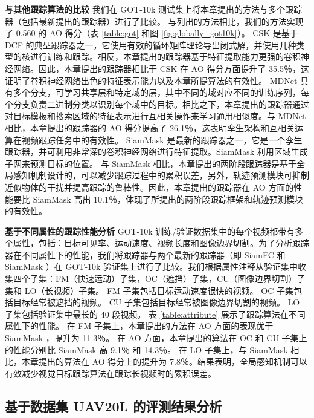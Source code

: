 \textbf{与其他跟踪算法的比较}
我们在 GOT-10k 测试集上将本章提出的方法与多个跟踪器（包括最新提出的跟踪器）进行了比较。
与列出的方法相比，我们的方法实现了 0.560 的 AO 得分（表 \ref{table:got} 和图 \ref{fig:globally_got10k}）。
CSK \cite{Henriques2012ExploitingTC} 是基于 DCF 的典型跟踪器之一，它使用有效的循环矩阵理论导出闭式解，并使用几种类型的核进行训练和跟踪。相反，本章提出的跟踪器基于特征提取能力更强的卷积神经网络。因此，本章提出的跟踪器相比于 CSK 在 AO 得分方面提升了 35.5％，这证明了卷积神经网络出色的特征表示能力以及本章所提算法的有效性。
MDNet \cite{MDNet} 具有多个分支，可学习共享层和特定域的层，其中不同的域对应不同的训练序列，每个分支负责二进制分类以识别每个域中的目标。相比之下，本章提出的跟踪器通过对目标模板和搜索区域的特征表示进行互相关操作来学习通用相似度。与 MDNet 相比，本章提出的跟踪器的 AO 得分提高了 26.1％，这表明孪生架构和互相关运算在视频跟踪任务中的有效性。
SiamMask \cite{Wang2018SiamMask} 是最新的跟踪器之一，它是一个孪生跟踪器，并可利用非常深的卷积神经网络进行特征提取。SiamMask 利用区域生成子网来预测目标的位置。
与 SiamMask 相比，本章提出的两阶段跟踪器是基于全局感知机制设计的，可以减少跟踪过程中的累积误差，另外，轨迹预测模块可抑制近似物体的干扰并提高跟踪的鲁棒性。因此，本章提出的跟踪器在 AO 方面的性能要比 SiamMask 高出 10.1％，体现了所提出的两阶段跟踪框架和轨迹预测模块的有效性。

\textbf{基于不同属性的跟踪性能分析}
GOT-10k 训练/验证数据集中的每个视频都带有多个属性，包括：目标可见率、运动速度、视频长度和图像边界切割。为了分析跟踪器在不同属性下的性能，我们将跟踪器与两个最新的跟踪器（即 SiamFC \cite{SiamFC} 和 SiamMask \cite{Wang2018SiamMask}）在 GOT-10k 验证集上进行了比较。我们根据属性注释从验证集中收集四个子集：FM（快速运动）子集，OC（遮挡）子集，CU（图像边界切割）子集和 LO（长视频）子集。
FM 子集包括目标运动速度很快的视频。
OC 子集包括目标经常被遮挡的视频。
CU 子集包括目标经常被图像边界切割的视频。
LO 子集包括验证集中最长的 40 段视频。
表 \ref{table:attribute} 展示了跟踪算法在不同属性下的性能。
在 FM 子集上，本章提出的方法在 AO 方面的表现优于 SiamMask \cite{Wang2018SiamMask}，提升为 11.3％。
在 AO 方面，本章提出的算法在 OC 和 CU 子集上的性能分别比 SiamMask 高 9.1％ 和 14.3％。
在 LO 子集上，与 SiamMask 相比，本章提出的算法在 AO 得分上的提升为 7.8％。结果表明，全局感知机制可以有效减少视觉目标跟踪算法在跟踪长视频时的累积误差。

\subsection{基于数据集 UAV20L 的评测结果分析}

